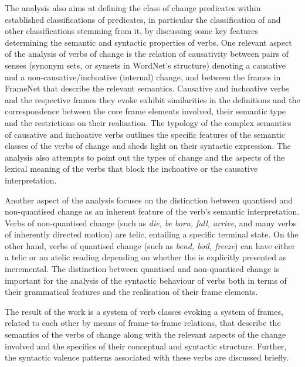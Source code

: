 \documentclass[output=paper,colorlinks,citecolor=brown]{langscibook}
\begin{document}
The analysis also aims at defining the class of change predicates within established classifications of predicates, in particular the classification of \citet{Levin1993} and other classifications stemming from it, by discussing some key features determining the semantic and syntactic properties of verbs. One relevant aspect of the analysis of verbs of change is the relation of causativity between pairs of senses (synonym sets, or synsets in WordNet's structure) denoting a causative and a non-causative/inchoative (internal) change, and between the frames in FrameNet that describe the relevant semantics. Causative and inchoative verbs and the respective frames they evoke exhibit similarities in the definitions and the correspondence between the core frame elements involved, their semantic type and the restrictions on their realisation. The typology of the complex semantics of causative and inchoative verbs outlines the specific features of the semantic classes of the verbs of change and sheds light on their syntactic expression. The analysis also attempts to point out the types of change and the aspects of the lexical meaning of the verbs that block the inchoative or the causative interpretation.

Another aspect of the analysis focuses on the distinction between quantised and  non-quantised change as an inherent feature of the verb's semantic interpretation. Verbs of non-quantised change (such as \textit{die, be born, fall, arrive}, and many verbs of inherently directed motion) are telic, entailing a specific terminal state. On the other hand, verbs of  quantised change (such as \textit{bend, boil, freeze}) can have either a telic or an atelic reading depending on whether the  is explicitly presented as incremental. The distinction between quantised and non-quantised change is important for the analysis of the syntactic behaviour of verbs both in terms of their grammatical features and the realisation of their frame elements.

The result of the work is a system of verb classes evoking a system of frames, related to each other by means of frame-to-frame relations, that describe the semantics of the verbs of change along with the relevant aspects of the change involved and the specifics of their conceptual and syntactic structure.  Further, the syntactic valence patterns associated with these verbs are discussed briefly.
\end{document}
